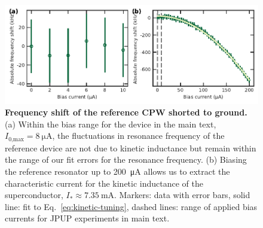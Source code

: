 \begin{figure}
	\centering
	\includegraphics[width=\linewidth]{chapter-currentdetection/figures/SM_frequency_shift_ref}
	\caption{
		\textbf{Frequency shift of the reference CPW shorted to ground.}
		(a) Within the bias range for the device in the main text, $I_\text{0,max}=\SI{8}{\micro\ampere}$, the fluctuations in resonance frequency of the reference device are not due to kinetic inductance but remain within the range of our fit errors for the resonance frequency.
		(b) Biasing the reference resonator up to \SI{200}{\micro\ampere} allows us to extract the characteristic current for the kinetic inductance of the superconductor, $I_*\approx\SI{7.35}{\milli\ampere}$.
		Markers: data with error bars, solid line: fit to Eq.~\eqref{eq:kinetic-tuning}, dashed lines: range of applied bias currents for JPUP experiments in main text.
	}
	\label{fig:reference-current}
\end{figure}



